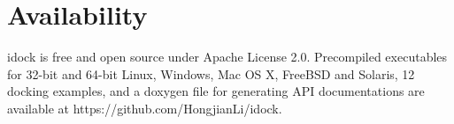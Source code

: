 \section{Availability}

idock is free and open source under Apache License 2.0. Precompiled executables for 32-bit and 64-bit Linux, Windows, Mac OS X, FreeBSD and Solaris, 12 docking examples, and a doxygen file for generating API documentations are available at https://github.com/HongjianLi/idock.

\chapterend

